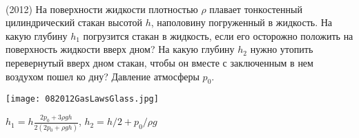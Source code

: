 \begin{ex}
\hspace{0pt} \\
\begin{minipage}{.65\textwidth}
(2012) На поверхности жидкости плотностью $\rho$ плавает тонкостенный цилиндрический стакан высотой $h$, наполовину погруженный в жидкость. 
На какую глубину $h_1$ погрузится стакан в жидкость, если его осторожно положить на поверхность жидкости вверх дном? 
На какую глубину $h_2$ нужно утопить перевернутый вверх дном стакан, чтобы он вместе с заключенным в нем воздухом пошел ко дну? Давление атмосферы $p_0$.
\end{minipage}
\begin{minipage}{.35\textwidth}
\centering
\texttt{[image: 082012GasLawsGlass.jpg]}
\end{minipage}
\begin{ans}
$h_1 = h \frac{2p_0+3\rho gh}{2(2p_0 + \rho gh)}$, $h_2 = h/2 + p_0/\rho g$
\end{ans}
\end{ex}


